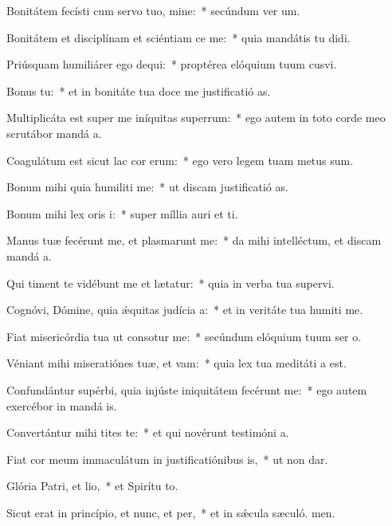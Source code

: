 \item Bonitátem fecísti cum servo tuo, mine:~* secúndum ver um.
\item Bonitátem et disciplínam et sciéntiam ce me:~* quia mandátis tu didi.
\item Priúsquam humiliárer ego dequi:~* proptérea elóquium tuum cusvi.
\item Bonus  tu:~* et in bonitáte tua doce me justificatió as.
\item Multiplicáta est super me iníquitas superrum:~* ego autem in toto corde meo scrutábor mandá a.
\item Coagulátum est sicut lac cor erum:~* ego vero legem tuam metus sum.
\item Bonum mihi quia humiliti me:~* ut discam justificatió as.
\item Bonum mihi lex oris i:~* super míllia auri et ti.
\item Manus tuæ fecérunt me, et plasmarunt me:~* da mihi intelléctum, et discam mandá a.
\item Qui timent te vidébunt me et lætatur:~* quia in verba tua supervi.
\item Cognóvi, Dómine, quia ǽquitas judícia a:~* et in veritáte tua humiti me.
\item Fiat misericórdia tua ut consotur me:~* secúndum elóquium tuum ser o.
\item Véniant mihi miseratiónes tuæ, et vam:~* quia lex tua meditáti a est.
\item Confundántur supérbi, quia injúste iniquitátem fecérunt  me:~* ego autem exercébor in mandá is.
\item Convertántur mihi tites te:~* et qui novérunt testimóni a.
\item Fiat cor meum immaculátum in justificatiónibus is,~* ut non dar.
\item Glória Patri, et lio,~* et Spirítu to.
\item Sicut erat in princípio, et nunc, et per,~* et in sǽcula sæculó. men.
